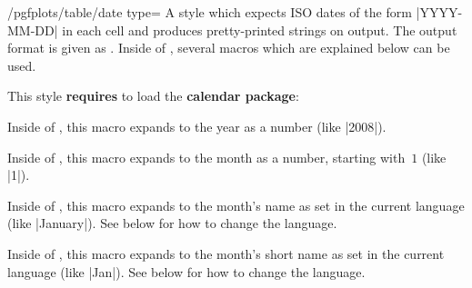 \documentclass[a4paper]{ltxdoc}
\begin{document}
\begin{stylekey}{/pgfplots/table/date type=}%
    A style which expects ISO dates of the form |YYYY-MM-DD| in each cell and
    produces pretty-printed strings on output. The output format is given as
    . Inside of , several macros which are
    explained below can be used.
\begin{codeexample}[]

%

\hspace{1cm}
\end{codeexample}
    This style \textbf{requires} to load the \PGF{} \textbf{calendar package}:
\begin{codeexample}
\usepackage{pgfcalendar}
\end{codeexample}

    \begin{command}{\year}
        Inside of , this macro expands to the year as a
        number (like |2008|).
    \end{command}

    \begin{command}{\month}
        Inside of , this macro expands to the month as a
        number, starting with~$1$ (like |1|).
    \end{command}

    \begin{command}{\monthname}
        Inside of , this macro expands to the month's name as
        set in the current language (like |January|). See below for how to
        change the language.
    \end{command}

    \begin{command}{\monthshortname}
        Inside of , this macro expands to the month's short
        name as set in the current language (like |Jan|). See below for how to
        change the language.
    \end{command}


\end{stylekey}
\end{document}
